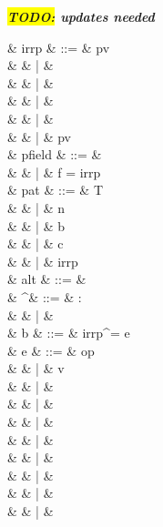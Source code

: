 \documentclass[a4paper]{article}
\newcommand{\TODO}[1]{\textbf{\textsl{\colorbox{yellow}{TODO:} #1}}}
\newcommand{\todo}[1]{\TODO{#1}}
\begin{document}
\todo{updates needed}

{
\small
\begin{grammar}
   & irrp & ::= & pv \\
                        &      & |   &  \\
                        &      & |   &  \\
                        &      & |   & \sWILDCARD \\
                        &      & |   & \sunit \\
                        &      & |   & pv\  \\
   & pfield & ::= & \sALLFIELDS \\
                       &        & |   & f = irrp \\
   & pat & ::= & T\  \\
                 &     & |   & n\\
                 &     & |   & b\\
                 &     & |   & c\\
                 &     & |   & irrp\\
   & alt & ::= & \\
   & \cdot^\tau & ::= & \cdot : \tau \\
                         &          & |   & \cdot \\
   & b & ::= & irrp^\tau = e\ \sBANG {} \\
   & e & ::= & op\  \\
                    &   & |   & v \\
                    &   & |   &  \\
                    &   & |   &  \\
                    &   & |   &  \\
                    &   & |   &  \\
                    &   & |   &  \\
                    &   & |   &  \\
                    &   & |   &  \\
                    &   & |   & \sunit \\

\end{grammar}}
\end{document}
